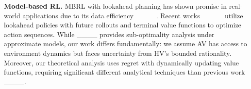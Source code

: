 
{\bf Model-based RL.} MBRL with lookahead planning has shown promise in real-world applications due to its data efficiency ____. Recent works ____ utilize lookahead policies with future rollouts and terminal value functions to optimize action sequences. While ____ provides sub-optimality analysis under approximate models, our work differs fundamentally: we assume AV has access to environment dynamics but faces uncertainty from HV's bounded rationality. Moreover, our theoretical analysis uses regret with dynamically updating value functions, requiring significant different analytical techniques than previous work ____.